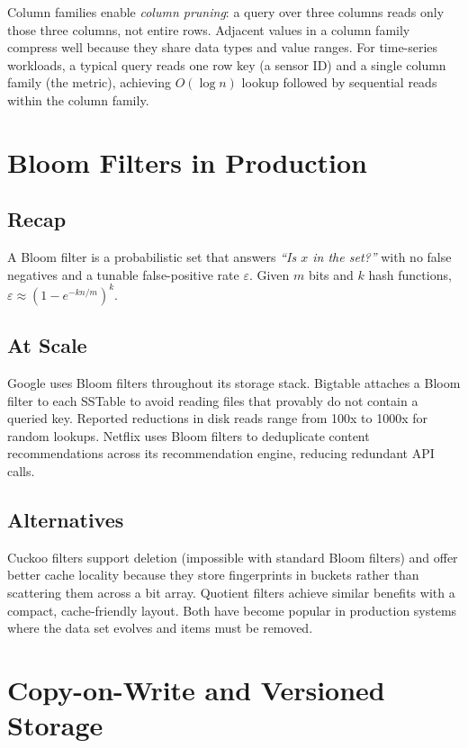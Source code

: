 Column families enable \emph{column pruning}: a query over three columns reads only
those three columns, not entire rows.  Adjacent values in a column family compress
well because they share data types and value ranges.  For time-series workloads,
a typical query reads one row key (a sensor ID) and a single column family (the
metric), achieving $O(\log n)$ lookup followed by sequential reads within the column
family.

\section{Bloom Filters in Production}

\subsection{Recap}

A Bloom filter is a probabilistic set that answers \emph{``Is $x$ in the set?''}
with no false negatives and a tunable false-positive rate $\varepsilon$.  Given $m$
bits and $k$ hash functions, $\varepsilon \approx (1 - e^{-kn/m})^k$.

\subsection{At Scale}

Google uses Bloom filters throughout its storage stack.  Bigtable attaches a Bloom
filter to each SSTable to avoid reading files that provably do not contain a queried
key.  Reported reductions in disk reads range from 100x to 1000x for random lookups.
Netflix uses Bloom filters to deduplicate content recommendations across its
recommendation engine, reducing redundant API calls.

\subsection{Alternatives}

Cuckoo filters support deletion (impossible with standard Bloom filters) and offer
better cache locality because they store fingerprints in buckets rather than
scattering them across a bit array.  Quotient filters achieve similar benefits with
a compact, cache-friendly layout.  Both have become popular in production systems
where the data set evolves and items must be removed.

\section{Copy-on-Write and Versioned Storage}

